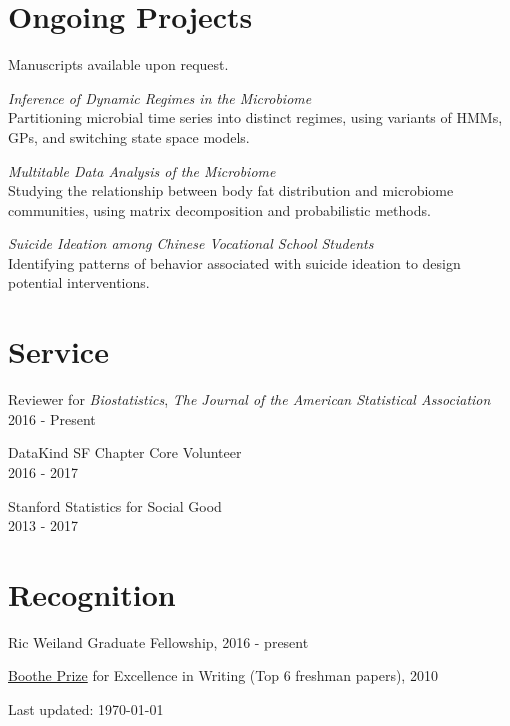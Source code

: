 \documentclass[letterpaper]{article}
\def\footerlink{}
\renewenvironment{itemize}{
  \begin{list}{}{
    \setlength{\leftmargin}{1.5em}
  }
}{
  \end{list}
}
\begin{document}
\section*{Ongoing Projects}
Manuscripts available upon request.
\begin{itemize}
  \item \textit{Inference of Dynamic Regimes in the Microbiome} \\
    Partitioning microbial time series into distinct regimes, using variants of
    HMMs, GPs, and switching state space models.
  \item \textit{Multitable Data Analysis of the Microbiome} \\
    Studying the relationship between body fat distribution and microbiome
    communities, using matrix decomposition and probabilistic methods.
  \item \textit{Suicide Ideation among Chinese Vocational School Students} \\
    Identifying patterns of behavior associated with suicide ideation to design
    potential interventions.
\end{itemize}

\section*{Service}

\begin{itemize}
\item Reviewer for \textit{Biostatistics}, \textit{The Journal of the American Statistical Association} \\
  2016 - Present
\item DataKind SF Chapter Core Volunteer \\
  2016 - 2017
\item Stanford Statistics for Social Good \\
  2013 - 2017
\end{itemize}

\section*{Recognition}
\begin{itemize}
\item Ric Weiland Graduate Fellowship, 2016 - present
\item \href{https://undergrad.stanford.edu/programs/pwr/publications-prizes-and-awards/boothe-prize-essays}{Boothe Prize} for Excellence in Writing (Top 6 freshman papers), 2010
\end{itemize}

\begin{center}
  \begin{footnotesize}
    Last updated: \today \\
    \href{\footerlink}{\texttt{\footerlink}}
  \end{footnotesize}
\end{center}
\end{document}
